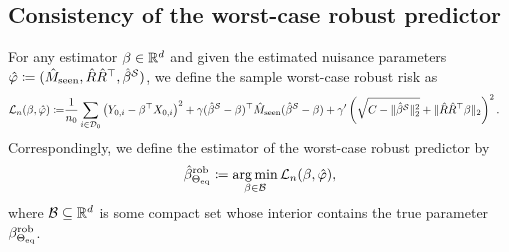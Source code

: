 
\subsection{Consistency of the worst-case robust predictor} 
For any estimator $\beta \in \mathbb{R}^d$ and given the estimated nuisance parameters $\hat\varphi \coloneqq (\hat{M}_{\mathrm{seen}}, \hat{R}\hat{R}^\top, \hat{\beta}^{\mathcal{S}})$, we define the sample worst-case robust risk as
\begin{align}\label{eqn:rob-loss-ell-sample}
\begin{split}
    \mathcal{L}_n(\beta, \hat{\varphi})  \coloneqq &
    \frac{1}{n_0}
    \sum_{i \in \mathcal{D}_0}\left(Y_{0,i} - \beta^\top X_{0,i} \right)^2
    + \gamma (\hat{\beta}^{\mathcal{S}} - \beta)^\top \hat{M}_{\mathrm{seen}} (\hat{\beta}^{\mathcal{S}} - \beta) 
    +   \gamma' \left(\sqrt{C - \|\hat{\beta}^{\mathcal{S}}\|_2^2} 
+ \|\hat{R}\hat{R}^\top\beta\|_2\right)^2.
\end{split}
\end{align}
Correspondingly, we define the estimator of the worst-case robust predictor by
\begin{align}\label{eqn:betarobpi-consistent}
    \hat{\beta}^{\mathrm{rob}}_{\Theta_{\mathrm{eq}}} \coloneqq \operatorname*{arg\,min}_{\beta \in \mathcal{B}} \mathcal{L}_n(\beta, \hat{\varphi}),
\end{align}
where $\mathcal{B} \subseteq \mathbb{R}^d$ is some compact set whose interior contains the true parameter $\beta^{\mathrm{rob}}_{\Theta_{\mathrm{eq}}}$.


